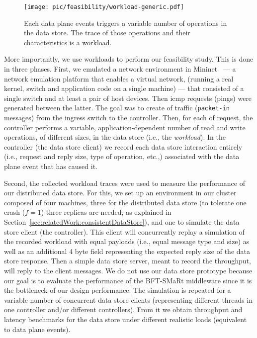 \begin{figure}[ht]
  \centering
  \texttt{[image: pic/feasibility/workload-generic.pdf]}   
  \caption[Workload definition]{Each data plane events triggers a variable number of operations in the data store. The trace of those operations and their characteristics is a workload.}
  \label{fig:feasibility:workloads}
\end{figure}

More importantly, we use workloads to perform our feasibility study. This is done in three phases. 
First, we emulated a network environment in Mininet~\cite{Handigol:2012tg} --- a network emulation platform that enables a virtual network, (running a real kernel, switch and application code on a single machine) ---  that consisted of a single switch and at least a pair of host devices.
Then \gls{icmp} requests (pings) were generated between the latter. 
The goal was to create \gls{of}  traffic (\texttt{packet-in} messages) from the ingress switch to the controller.
Then, for each \gls{of} request, the controller performs a variable, application-dependent number of read and write operations, of different sizes, in the data store (i.e., the \textit{workload}). 
In the controller  (the data store client) we record each data store interaction entirely (i.e., request and reply size, type of operation, etc.,)  associated with the data plane event that has caused it. 

Second, the collected workload traces were used to measure the performance of our distributed data store.
For this, we set up an environment in our cluster composed of four machines, three for the distributed data store (to tolerate one crash ($f=1$) three replicas are needed, as explained in Section~\ref{sec:relatedWork:consistentDataStore}), and one to simulate the data store client (the controller). 
This client will concurrently replay a simulation of the recorded workload with equal payloads (i.e., equal message type and size) as well as an additional 4 byte field representing the expected reply size of the data store response. 
Then a simple data store server, meant to record the throughput, will reply to the client messages. 
We do not use our data store prototype  because our  goal is to evaluate the performance of the BFT-SMaRt middleware since it is the bottleneck of our design performance. 
The simulation is repeated for a variable number of concurrent data store clients (representing different threads in one controller and/or different controllers).
From it we obtain throughput and latency benchmarks for the data store under different realistic loads (equivalent to data plane events).  

